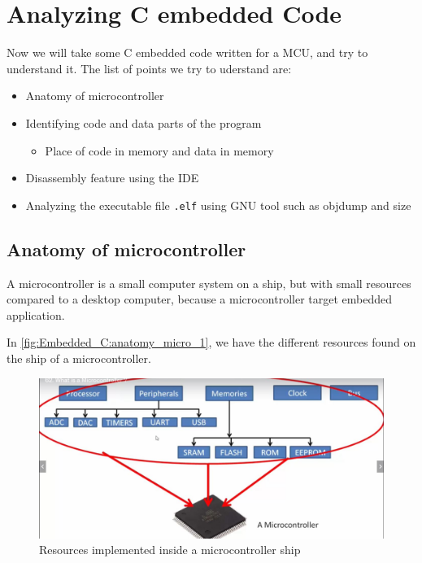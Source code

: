 \section{Analyzing C embedded Code}

Now we will take some C embedded code written for a MCU, and try to understand it. The list of points we try to uderstand are:

\begin{itemize}
    \item Anatomy of microcontroller
    
    \item Identifying code and data parts of the program
    
    \begin{itemize}
        \item Place of code in memory and data in memory
    \end{itemize}
    
    \item Disassembly feature using the IDE
    
    \item Analyzing the executable file \verb|.elf| using GNU tool such as objdump and size
    
\end{itemize}


\subsection{Anatomy of microcontroller}

A microcontroller is a small computer system on a ship, but with small resources compared to a desktop computer, because a microcontroller target embedded application.

In \autoref{fig:Embedded_C:anatomy_micro_1}, we have the different resources found on the ship of a microcontroller.

\begin{figure}[h]
\centering
\includegraphics[scale=0.5]{Figures/Embedded_C/anatomy_micro_1}
\caption{Resources implemented inside a microcontroller ship}
\label{fig:Embedded_C:anatomy_micro_1}
\end{figure} 

